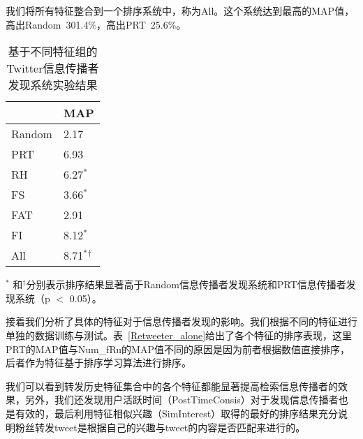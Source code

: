 我们将所有特征整合到一个排序系统中，称为All。这个系统达到最高的MAP值，高出Random~301.4\%，高出PRT~25.6\%。

\begin{table}[!htbp]
 \centering
  \caption{基于不同特征组的Twitter信息传播者发现系统实验结果}
 \label{Retweeter_group}
 \begin{tabular}{|l l|}
 \hline
 & MAP \\
 \hline
Random & 2.17\\
PRT &6.93\\
 \hline
RH & 6.27$^\ast$\\
FS &3.66$^\ast$\\
FAT & 2.91\\
FI & 8.12$^\ast$\\
All&8.71$^\ast$$^\dagger$\\
 \hline
 \end{tabular}
   \begin{tablenotes}
        \footnotesize
\item $^\ast$ 和$^\dagger$分别表示排序结果显著高于Random信息传播者发现系统和PRT信息传播者发现系统（p $<$ 0.05）。
\end{tablenotes}
\end{table}

接着我们分析了具体的特征对于信息传播者发现的影响。我们根据不同的特征进行单独的数据训练与测试。表~\ref{Retweeter_alone}给出了各个特征的排序表现，这里PRT的MAP值与Num\_fRu的MAP值不同的原因是因为前者根据数值直接排序，后者作为特征基于排序学习算法进行排序。

我们可以看到转发历史特征集合中的各个特征都能显著提高检索信息传播者的效果，另外，我们还发现用户活跃时间（PostTimeConsis）对于发现信息传播者也是有效的，最后利用特征相似兴趣（SimInterest）取得的最好的排序结果充分说明粉丝转发tweet是根据自己的兴趣与tweet的内容是否匹配来进行的。

